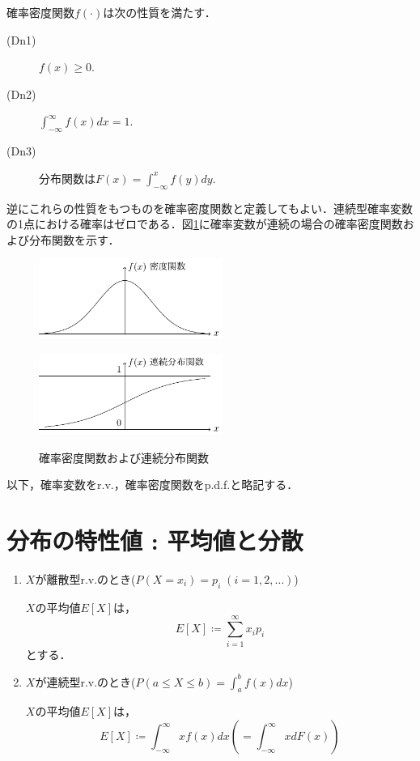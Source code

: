 \documentclass{jsreport}
\begin{document}
確率密度関数$f(\cdot)$は次の性質を満たす．
\begin{description}
  \item[(Dn1)] $f(x) \geq 0$.
  \item[(Dn2)] $\int_{-\infty}^{\infty} f(x) dx = 1$.
  \item[(Dn3)] 分布関数は$F(x) = \int_{-\infty}^x f(y) dy$.
\end{description}
逆にこれらの性質をもつものを確率密度関数と定義してもよい．連続型確率変数の1点における確率はゼロである．図\ref{fig:con}に確率変数が連続の場合の確率密度関数および分布関数を示す．
\begin{figure}[htb]
  \begin{minipage}[b]{0.5\linewidth}
    \centering
    \includegraphics[clip, width=6cm]{../figure/cpf.pdf}
    \label{fig:cpf}
  \end{minipage}
  \begin{minipage}[b]{0.5\linewidth}
    \centering
    \includegraphics[clip, width=6cm]{../figure/cpdf.pdf}
    \label{fig:cpdf}
  \end{minipage}
  \caption{確率密度関数および連続分布関数}\label{fig:con}
\end{figure}

以下，確率変数をr.v.，確率密度関数をp.d.f.と略記する．
\section{分布の特性値 : 平均値と分散}
\begin{screen}
  \begin{defi}[平均値]
    \begin{enumerate}
      \item $X$が離散型r.v.のとき($P(X=x_i) = p_i \; (i = 1, 2, \ldots)$)

      $X$の平均値$E[X]$は，
      \begin{equation}
        E[X] \coloneqq \sum_{i = 1}^{\infty} x_i p_i \nonumber
      \end{equation}
      とする．
      \item $X$が連続型r.v.のとき($P(a \leq X \leq b) = \int_{a}^b f(x) dx$)

      $X$の平均値$E[X]$は，
      \begin{equation}
        E[X] \coloneqq \int_{-\infty}^{\infty} x f(x) dx \left(=\int_{-\infty}^{\infty} x dF(x)\right) \nonumber
      \end{equation}
    \end{enumerate}
  \end{defi}
\end{screen}
\end{document}
